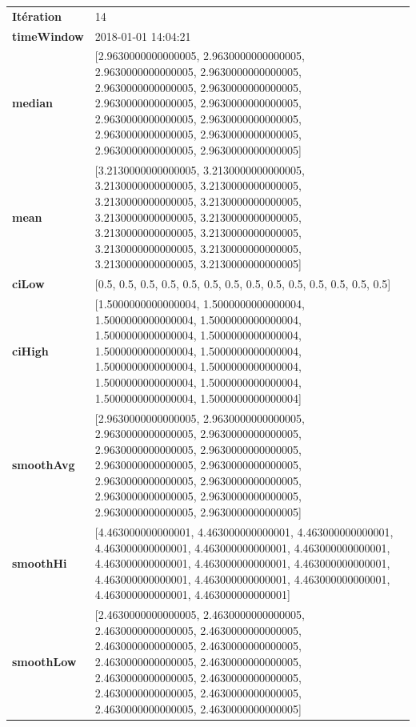 \begin{table}[H]
	\centering
	\begin{tabularx}{\textwidth}{lX}
		\textbf{Itération}& 14\\
		\textbf{timeWindow}	 & 2018-01-01 14:04:21   \\
		\textbf{median} & [2.9630000000000005, 2.9630000000000005, 2.9630000000000005, 2.9630000000000005, 2.9630000000000005, 2.9630000000000005, 2.9630000000000005, 2.9630000000000005, 2.9630000000000005, 2.9630000000000005, 2.9630000000000005, 2.9630000000000005, 2.9630000000000005, 2.9630000000000005] 
		\\ 
		\textbf{mean} & [3.2130000000000005, 3.2130000000000005, 3.2130000000000005, 3.2130000000000005, 3.2130000000000005, 3.2130000000000005, 3.2130000000000005, 3.2130000000000005, 3.2130000000000005, 3.2130000000000005, 3.2130000000000005, 3.2130000000000005, 3.2130000000000005, 3.2130000000000005] 
		\\
		\textbf{ciLow} & [0.5, 0.5, 0.5, 0.5, 0.5, 0.5, 0.5, 0.5, 0.5, 0.5, 0.5, 0.5, 0.5, 0.5] 
		\\
		\textbf{ciHigh}& [1.5000000000000004, 1.5000000000000004, 1.5000000000000004, 1.5000000000000004, 1.5000000000000004, 1.5000000000000004, 1.5000000000000004, 1.5000000000000004, 1.5000000000000004, 1.5000000000000004, 1.5000000000000004, 1.5000000000000004, 1.5000000000000004, 1.5000000000000004] 
		\\
		\textbf{smoothAvg} & [2.9630000000000005, 2.9630000000000005, 2.9630000000000005, 2.9630000000000005, 2.9630000000000005, 2.9630000000000005, 2.9630000000000005, 2.9630000000000005, 2.9630000000000005, 2.9630000000000005, 2.9630000000000005, 2.9630000000000005, 2.9630000000000005, 2.9630000000000005] 
		\\
		\textbf{smoothHi} & [4.463000000000001, 4.463000000000001, 4.463000000000001, 4.463000000000001, 4.463000000000001, 4.463000000000001, 4.463000000000001, 4.463000000000001, 4.463000000000001, 4.463000000000001, 4.463000000000001, 4.463000000000001, 4.463000000000001, 4.463000000000001] 
		\\
		\textbf{smoothLow} &[2.4630000000000005, 2.4630000000000005, 2.4630000000000005, 2.4630000000000005, 2.4630000000000005, 2.4630000000000005, 2.4630000000000005, 2.4630000000000005, 2.4630000000000005, 2.4630000000000005, 2.4630000000000005, 2.4630000000000005, 2.4630000000000005, 2.4630000000000005]
		\\ 
	\end{tabularx} 
\end{table}

